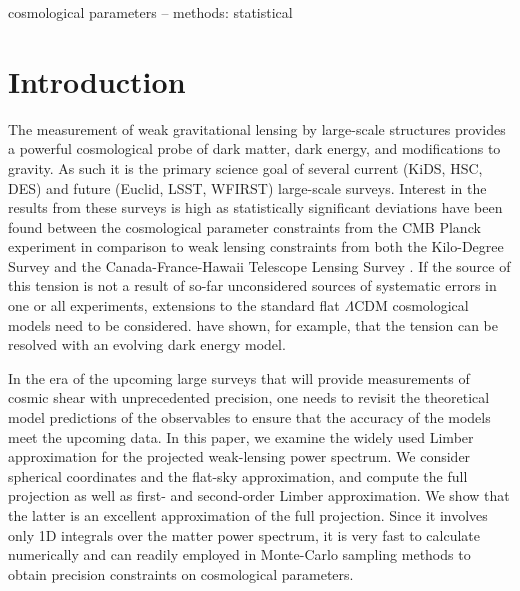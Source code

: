 \documentclass[fleqn,usenatbib]{mnras} %
\begin{document}
\begin{keywords}
cosmological parameters -- methods: statistical
\end{keywords}



\section{Introduction}
\label{sec:intro}

The measurement of weak gravitational lensing by large-scale structures
provides a powerful cosmological probe of dark matter, dark energy, and
modifications to gravity.  As such it is the primary science goal of several
current (KiDS, HSC, DES) and future (Euclid, LSST, WFIRST) large-scale surveys.
Interest in the results from these surveys is high as statistically significant
deviations have been found between the cosmological parameter constraints from
the CMB Planck experiment \citep{2015arXiv150201589P} in comparison to weak
lensing constraints from both the Kilo-Degree Survey \citep[KiDS;][]{KiDS-450}
and the Canada-France-Hawaii Telescope Lensing Survey
\citep[CFHTLenS;][]{2016arXiv160105786J}.  If the source of this tension is not
a result of so-far unconsidered sources of systematic errors in one or all
experiments, extensions to the standard flat $\Lambda$CDM cosmological models
need to be considered. \citet{joudaki/etal:2017} have shown, for example, that
the tension can be resolved with an evolving dark energy model.

In the era of the upcoming large surveys that will provide measurements of
cosmic shear with unprecedented precision, one needs to revisit the theoretical
model predictions of the observables to ensure that the accuracy of the
models meet the upcoming data. In this paper, we examine the widely used Limber
approximation for the projected weak-lensing power spectrum. We consider
spherical coordinates and the flat-sky approximation, and compute the full
projection as well as first- and second-order Limber approximation. We show
that the latter is an excellent approximation of the full projection. Since it
involves only 1D integrals over the matter power spectrum, it is very fast to
calculate numerically and can readily employed in Monte-Carlo sampling methods
to obtain precision constraints on cosmological parameters.
\end{document}
